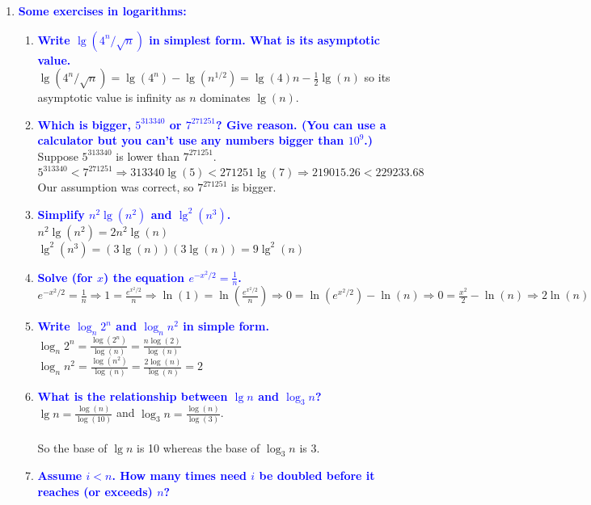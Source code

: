 \documentclass[11pt]{article}
\begin{document}
\begin{enumerate}
\item \textbf{\textcolor{blue}{Some exercises in logarithms:}}
    \begin{enumerate}
    \item \textbf{\textcolor{blue}{Write $\lg(4^n/\sqrt{n})$ in simplest form.  What is its asymptotic value.}}
        \\ $\lg(4^n/\sqrt{n}) = \lg(4^n) - \lg(n^{1/2}) = \lg(4)n - \frac{1}{2}\lg(n)$ so its asymptotic value is infinity as $n$ dominates $\lg(n)$.
    \item \textbf{\textcolor{blue}{Which is bigger, $5^{313340}$ or $7^{271251}$? Give reason. (You can use a calculator but you can't use any numbers bigger than $10^9$.)}}
        \\ Suppose $5^{313340}$ is lower than $7^{271251}$.
        \\ $5^{313340} < 7^{271251} \Rightarrow 313340\lg(5) < 271251\lg(7) \Rightarrow 219015.26 < 229233.68$
        \\ Our assumption was correct, so $7^{271251}$ is bigger.
    \item \textbf{\textcolor{blue}{Simplify $n^2\lg(n^2)$ and $\lg^2(n^3)$.}}
        \\ $n^2\lg(n^2) = 2n^2\lg(n)$
        \\ $\lg^2(n^3) = (3\lg(n))(3\lg(n)) = 9\lg^2(n)$
    \item \textbf{\textcolor{blue}{Solve (for $x$) the equation $e^{-x^2/2}=\frac{1}{n}$.}}
        \\ $e^{-x^2/2}=\frac{1}{n} \Rightarrow 1=\frac{e^{x^2/2}}{n} \Rightarrow \ln(1)=\ln(\frac{e^{x^2/2}}{n}) \Rightarrow 0 = \ln(e^{x^2/2}) - \ln(n) \Rightarrow 0 = \frac{x^2}{2} - \ln(n) \Rightarrow 2\ln(n) = x^2 \Rightarrow x = \mp \sqrt{2\ln(n)}$
    \item \textbf{\textcolor{blue}{Write $\log_n2^n$ and $\log_nn^2$ in simple form.}}
        \\ $\log_n2^n = \frac{\log(2^n)}{\log(n)} = \frac{n\log(2)}{\log(n)}$
        \\ $\log_nn^2 = \frac{\log(n^2)}{\log(n)} = \frac{2\log(n)}{\log(n)} = 2$
    \item \textbf{\textcolor{blue}{What is the relationship between $\lg n$ and $\log_3n$?}}
        \\ $\lg n = \frac{\log(n)}{\log(10)}$ and $\log_3n = \frac{\log(n)}{\log(3)}$.
        \\\\ So the base of $\lg n$ is 10 whereas the base of $\log_3n$ is 3.
    \item \textbf{\textcolor{blue}{Assume $i< n$.  How many times need $i$ be doubled before it reaches (or exceeds) $n$?}}

\end{enumerate}
\end{enumerate}
\end{document}
